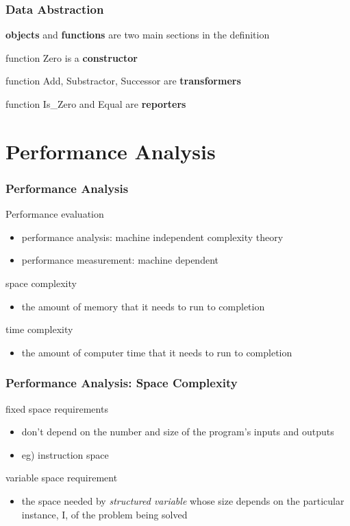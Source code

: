 \documentclass[newPxFont,sthlmFooter,nooffset]{beamer}
\begin{document}
\begin{frame}[t]
  \frametitle{Data Abstraction}
\textbf{objects} and \textbf{functions} are two main sections in the definition

function Zero is a \textbf{constructor} 

function Add, Substractor, Successor are \textbf{transformers}

function Is\_Zero and Equal are \textbf{reporters}
\end{frame}


\section{Performance Analysis}
\begin{frame}[t]
  \frametitle{Performance Analysis}
Performance evaluation 
\begin{itemize}
\item performance analysis: machine independent complexity theory 
\item performance measurement: machine dependent
\end{itemize}

space complexity
\begin{itemize}
\item the amount of memory that it needs to run to completion
\end{itemize}

time complexity
\begin{itemize}
\item the amount of computer time that it needs to run to completion
\end{itemize}

\end{frame}

\begin{frame}[t]
  \frametitle{Performance Analysis: Space Complexity}
fixed space requirements
\begin{itemize}
\item don’t depend on the number and size of the program’s inputs and
  outputs
\item eg) instruction space
\end{itemize}

variable space requirement
\begin{itemize}
\item the space needed by \textit{structured variable} whose size depends on
  the particular instance, I, of the problem being solved
\end{itemize}

\end{frame}
\end{document}
